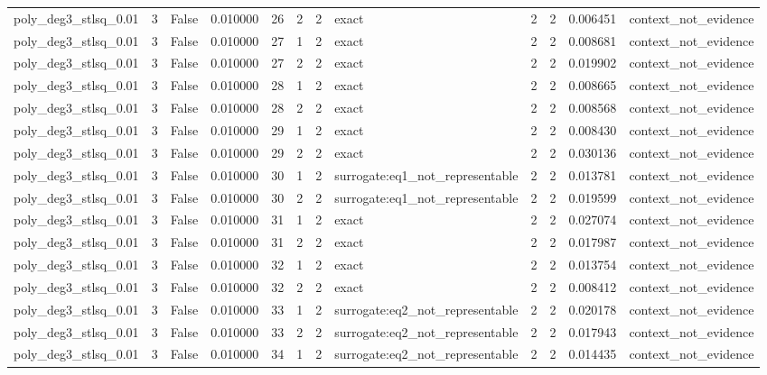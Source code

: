 \begin{tabular}{lrrrrrrlrrrl}
poly\_deg3\_stlsq\_0.01 & 3 & False & 0.010000 & 26 & 2 & 2 & exact & 2 & 2 & 0.006451 & context\_not\_evidence \\
poly\_deg3\_stlsq\_0.01 & 3 & False & 0.010000 & 27 & 1 & 2 & exact & 2 & 2 & 0.008681 & context\_not\_evidence \\
poly\_deg3\_stlsq\_0.01 & 3 & False & 0.010000 & 27 & 2 & 2 & exact & 2 & 2 & 0.019902 & context\_not\_evidence \\
poly\_deg3\_stlsq\_0.01 & 3 & False & 0.010000 & 28 & 1 & 2 & exact & 2 & 2 & 0.008665 & context\_not\_evidence \\
poly\_deg3\_stlsq\_0.01 & 3 & False & 0.010000 & 28 & 2 & 2 & exact & 2 & 2 & 0.008568 & context\_not\_evidence \\
poly\_deg3\_stlsq\_0.01 & 3 & False & 0.010000 & 29 & 1 & 2 & exact & 2 & 2 & 0.008430 & context\_not\_evidence \\
poly\_deg3\_stlsq\_0.01 & 3 & False & 0.010000 & 29 & 2 & 2 & exact & 2 & 2 & 0.030136 & context\_not\_evidence \\
poly\_deg3\_stlsq\_0.01 & 3 & False & 0.010000 & 30 & 1 & 2 & surrogate:eq1\_not\_representable & 2 & 2 & 0.013781 & context\_not\_evidence \\
poly\_deg3\_stlsq\_0.01 & 3 & False & 0.010000 & 30 & 2 & 2 & surrogate:eq1\_not\_representable & 2 & 2 & 0.019599 & context\_not\_evidence \\
poly\_deg3\_stlsq\_0.01 & 3 & False & 0.010000 & 31 & 1 & 2 & exact & 2 & 2 & 0.027074 & context\_not\_evidence \\
poly\_deg3\_stlsq\_0.01 & 3 & False & 0.010000 & 31 & 2 & 2 & exact & 2 & 2 & 0.017987 & context\_not\_evidence \\
poly\_deg3\_stlsq\_0.01 & 3 & False & 0.010000 & 32 & 1 & 2 & exact & 2 & 2 & 0.013754 & context\_not\_evidence \\
poly\_deg3\_stlsq\_0.01 & 3 & False & 0.010000 & 32 & 2 & 2 & exact & 2 & 2 & 0.008412 & context\_not\_evidence \\
poly\_deg3\_stlsq\_0.01 & 3 & False & 0.010000 & 33 & 1 & 2 & surrogate:eq2\_not\_representable & 2 & 2 & 0.020178 & context\_not\_evidence \\
poly\_deg3\_stlsq\_0.01 & 3 & False & 0.010000 & 33 & 2 & 2 & surrogate:eq2\_not\_representable & 2 & 2 & 0.017943 & context\_not\_evidence \\
poly\_deg3\_stlsq\_0.01 & 3 & False & 0.010000 & 34 & 1 & 2 & surrogate:eq2\_not\_representable & 2 & 2 & 0.014435 & context\_not\_evidence \\

\end{tabular}
